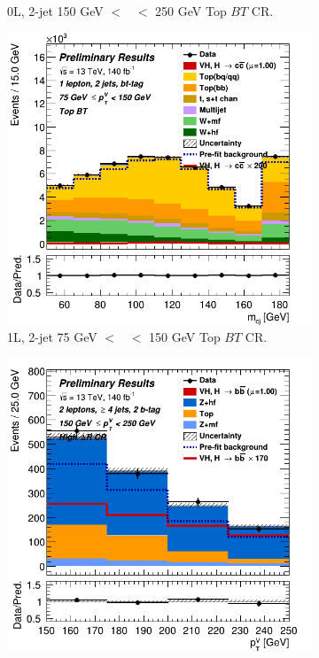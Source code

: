\begin{figure}[h!]
\begin{subfigure}[b]{0.32\textwidth}
        \caption{0L, 2-jet 150 GeV $<$ \ptv\ $<$ 250 GeV Top $BT$ CR.}
        \label{fig:posfit_0L_CR}
    \end{subfigure}
    \begin{subfigure}[b]{0.32\textwidth}
        \centering
        \includegraphics[width=\textwidth]{Images/VH/Own_fit/postfit_VHcc/Region_distmBB_BMax150_BMin75_DtopCRBC_J2_TTypebt_T1_L1_Y6051_GlobalFit_conditionnal_mu1.png}
        \caption{1L, 2-jet 75 GeV $<$ \ptv\ $<$ 150 GeV Top $BT$ CR.}
        \label{fig:posfit_1L_CR}
    \end{subfigure}
    \begin{subfigure}[b]{0.32\textwidth}
        \centering
        \includegraphics[width=\textwidth]{Images/VH/Own_fit/postfit_VHbb/Region_distpTV_BMax250_BMin150_DCRHigh_J4_TTypebb_incJet1_T2_L2_Y6051_GlobalFit_conditionnal_mu1.png}

\end{subfigure}
\end{figure}
